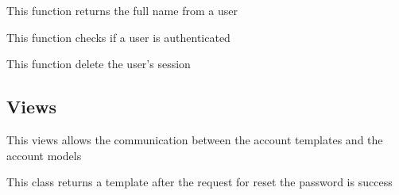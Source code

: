 \documentclass[letterpaper,10pt,english]{sphinxmanual}
\begin{document}
\begin{fulllineitems}
\label{modules/account:apps.account.models.getUserFullName}
This function returns the full name from a user

\end{fulllineitems}


\begin{fulllineitems}
\label{modules/account:apps.account.models.is_session}
This function checks if a user is authenticated

\end{fulllineitems}


\begin{fulllineitems}
\label{modules/account:apps.account.models.remove_session}
This function delete the user's session

\end{fulllineitems}



\subsection{Views}
\label{modules/account:views}
This views allows the communication between the account templates and the account models
\label{modules/account:module-apps.account.views}

\begin{fulllineitems}
\label{modules/account:apps.account.views.ForgetSucces}
This class returns a template after the request for reset the password is success

\end{fulllineitems}

\end{document}
